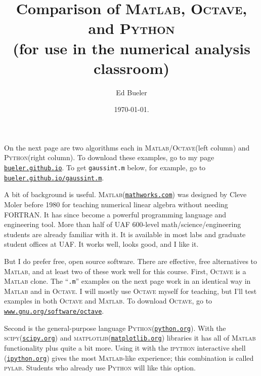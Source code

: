 \documentclass[11pt]{amsart}
\newcommand{\Matlab}{\textsc{Matlab}\xspace}
\newcommand{\Octave}{\textsc{Octave}\xspace}
\newcommand{\Python}{\textsc{Python}\xspace}
\newcommand{\pylab}{\textsc{pylab}\xspace}
\newcommand{\scipy}{\textsc{scipy}\xspace}
\newcommand{\matplotlib}{\textsc{matplotlib}\xspace}
\begin{document}
\title{Comparison of \textsc{Matlab}, \textsc{Octave}, and \textsc{Python} \\ (for use in the numerical analysis classroom)}

\author{Ed Bueler}

\date{\today.}

\maketitle
\normalsize
\thispagestyle{empty}

\newcommand{\hrf}[2]{\href{#1}{\texttt{#2}}}

On the next page are two algorithms each in \Matlab/\Octave (left column) and \Python (right column).  To download these examples, go to my page \hrf{http://bueler.github.io}{bueler.github.io}.  To get \texttt{gaussint.m} below, for example, go to \hrf{http://bueler.github.io/gaussint.m}{bueler.github.io/gaussint.m}.

A bit of background is useful.  \Matlab (\hrf{http://www.mathworks.com/}{mathworks.com}) was designed by Cleve Moler before 1980 for teaching numerical linear algebra without needing FORTRAN.  It has since become a powerful programming language and engineering tool.  More than half of UAF 600-level math/science/engineering students are already familiar with it.  It is available in most labs and graduate student offices at UAF.  It works well, looks good, and I like it.

But I do prefer free, open source software.  There are effective, free alternatives to \Matlab, and at least two of these work well for this course.  First, \Octave is a \Matlab clone.  The ``\texttt{.m}'' examples on the next page work in an identical way in \Matlab and in \Octave.  I will mostly use \Octave myself for teaching, but I'll test examples in both \Octave and \Matlab.  To download \Octave, go to 
\hrf{http://www.gnu.org/software/octave/}{www.gnu.org/software/octave}.

Second is the general-purpose language \Python (\hrf{http://python.org/}{python.org}).  With the \scipy (\hrf{http://www.scipy.org/}{scipy.org}) and \matplotlib (\hrf{http://matplotlib.org/}{matplotlib.org}) libraries it has all of \Matlab functionality plus quite a bit more.  Using it with the \textsc{ipython} interactive shell (\hrf{http://ipython.org/}{ipython.org}) gives the most \Matlab-like experience; this combination is called \pylab.  Students who already use \Python will like this option.
\end{document}
